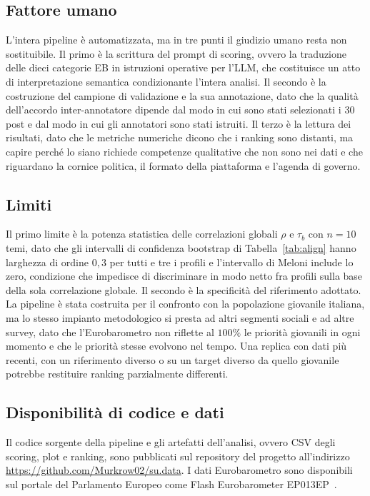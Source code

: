 \documentclass[11pt, a4paper]{article}
\begin{document}
\subsection{Fattore umano}

L'intera pipeline \`e automatizzata, ma in tre punti il giudizio umano
resta non sostituibile. Il primo \`e la scrittura del prompt di
scoring, ovvero la traduzione delle dieci categorie EB in istruzioni
operative per l'LLM, che costituisce un atto di interpretazione
semantica condizionante l'intera analisi. Il secondo \`e la
costruzione del campione di validazione e la sua annotazione, dato che
la qualit\`a dell'accordo inter-annotatore dipende dal modo in cui
sono stati selezionati i 30 post e dal modo in cui gli annotatori sono
stati istruiti. Il terzo \`e la lettura dei risultati, dato che le
metriche numeriche dicono che i ranking sono distanti, ma capire
perch\'e lo siano richiede competenze qualitative che non sono nei
dati e che riguardano la cornice politica, il formato della
piattaforma e l'agenda di governo.

\subsection{Limiti}\label{sec:limiti}

Il primo limite \`e la potenza statistica delle correlazioni globali
$\rho$ e $\tau_b$ con $n=10$ temi, dato che gli intervalli di
confidenza bootstrap di Tabella~\ref{tab:align} hanno larghezza di
ordine $0{,}3$ per tutti e tre i profili e l'intervallo di Meloni
include lo zero, condizione che impedisce di discriminare in modo
netto fra profili sulla base della sola correlazione globale. Il
secondo \`e la specificit\`a
del riferimento adottato. La pipeline \`e stata costruita per il confronto con la
popolazione giovanile italiana, ma lo stesso impianto metodologico si
presta ad altri segmenti sociali e ad altre survey, dato che
l'Eurobarometro non riflette al $100\%$ le priorit\`a giovanili in
ogni momento e che le priorit\`a stesse evolvono nel tempo. Una
replica con dati pi\`u recenti, con un riferimento diverso o su un
target diverso da quello giovanile potrebbe restituire ranking
parzialmente differenti.

\subsection{Disponibilit\`a di codice e dati}

Il codice sorgente della pipeline e gli artefatti dell'analisi, ovvero
CSV degli scoring, plot e ranking, sono pubblicati sul repository del
progetto all'indirizzo \url{https://github.com/Murkrow02/su.data}. I dati Eurobarometro sono
disponibili sul portale del Parlamento Europeo come Flash
Eurobarometer EP013EP~\cite{ep2024youth, ep2024youth_methodology}.



\end{document}
